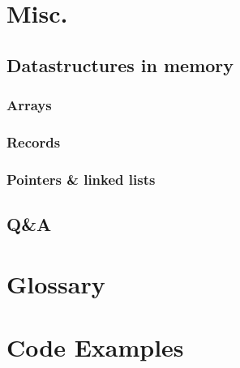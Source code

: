 \documentclass{article}
\begin{document}
    \section{Misc.}
        \subsection{Datastructures in memory}
        \subsubsection{Arrays}
        \subsubsection{Records}
        \subsubsection{Pointers \& linked lists}
        \subsection{Q\&A}

    \appendix
    \section{Glossary}
    \printnoidxglossaries

    \section{Code Examples}
\end{document}
